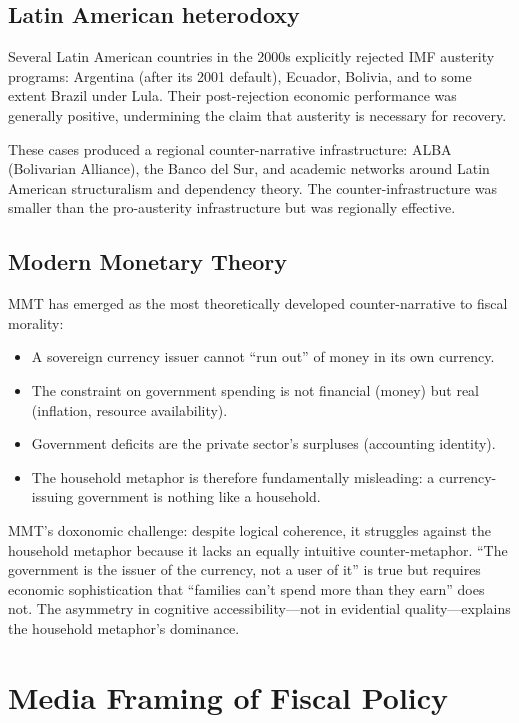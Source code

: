 \subsection{Latin American heterodoxy}

Several Latin American countries in the 2000s explicitly rejected IMF austerity programs: Argentina (after its 2001 default), Ecuador, Bolivia, and to some extent Brazil under Lula.
Their post-rejection economic performance was generally positive, undermining the claim that austerity is necessary for recovery.

These cases produced a regional counter-narrative infrastructure: ALBA (Bolivarian Alliance), the Banco del Sur, and academic networks around Latin American structuralism and dependency theory.
The counter-infrastructure was smaller than the pro-austerity infrastructure but was regionally effective.

\subsection{Modern Monetary Theory}

MMT has emerged as the most theoretically developed counter-narrative to fiscal morality:
\begin{itemize}[nosep]
  \item A sovereign currency issuer cannot ``run out'' of money in its own currency.
  \item The constraint on government spending is not financial (money) but real (inflation, resource availability).
  \item Government deficits are the private sector's surpluses (accounting identity).
  \item The household metaphor is therefore fundamentally misleading: a currency-issuing government is nothing like a household.
\end{itemize}

MMT's doxonomic challenge: despite logical coherence, it struggles against the household metaphor because it lacks an equally intuitive counter-metaphor.
``The government is the issuer of the currency, not a user of it'' is true but requires economic sophistication that ``families can't spend more than they earn'' does not.
The asymmetry in cognitive accessibility---not in evidential quality---explains the household metaphor's dominance.

\section{Media Framing of Fiscal Policy}
\label{sec:ch25-media}

